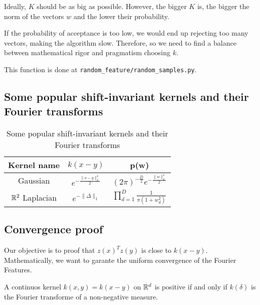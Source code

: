 Ideally, $K$ should be as big as  possible. 
However, the bigger $K$ is, the bigger the norm of the vectors $w$
and the lower their probability. 

If the probability of acceptance is too low, we would end up rejecting too many vectors, making the algorithm slow. Therefore, so we need to find a balance 
between mathematical rigor and pragmatism choosing $k$. 

This function is done at \texttt{random\_feature/random\_samples.py}. 


\subsection{Some popular shift-invariant kernels and their Fourier transforms}

\begin{table}[h!]
    \centering
    \begin{tabular}{|c|c|c|}
    \hline
     Kernel name & $k(x-y)$ & p(w) \\
     \hline
     Gaussian 
     & $e^{- \frac{\| x- y\|^2_2}{2}}$
    & 
    $(2 \pi)^{-\frac{D}{2}} e^{- \frac{\| w\|^2_2}{2}}$ 
    \\
    \hline
        $\mathbb{R}^2$ Laplacian 
        & 
        $e^{
            - \|\Delta\|_1
        }$
        &
        $\prod_{d = 1}^D \frac{1}{\pi(1+w_d^2)}$
        \\
    \hline
    \end{tabular}
    \caption{Some popular shift-invariant kernels and their Fourier transforms}
\end{table}


\subsection{Convergence proof}

Our objective is to proof that $z(x)^Tz(y)$ is close to $k(x-y)$. 
Mathematically, we want to garante the uniform convergence of the Fourier Features. 


\begin{theorem}
    A continuos kernel $k(x,y) = k(x-y)$ on $\mathbb{R}^d$ is positive 
    if and only if $k(\delta)$ is the Fourier transforme of a non-negative measure. 
\end{theorem}

